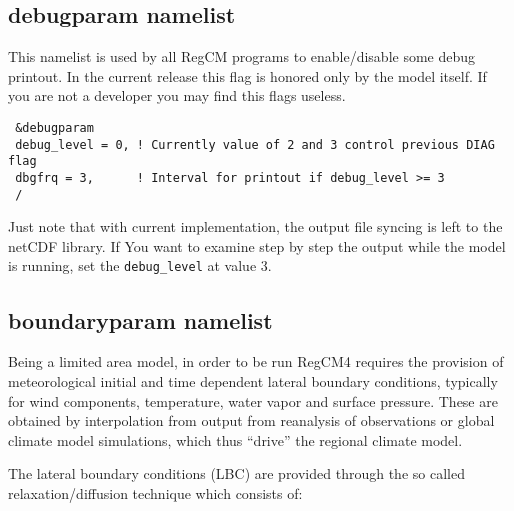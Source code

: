\subsection{debugparam namelist}

This namelist is used by all RegCM programs to enable/disable some debug
printout.  In the current release this flag is honored only by the model
itself. If you are not a developer you may find this flags useless.

{\footnotesize
\begin{Verbatim}
 &debugparam
 debug_level = 0, ! Currently value of 2 and 3 control previous DIAG flag
 dbgfrq = 3,      ! Interval for printout if debug_level >= 3
 /
\end{Verbatim}
}

Just note that with current implementation, the output file syncing is left
to the netCDF library. If You want to examine step by step the output while
the model is running, set the \verb=debug_level= at value 3.

\subsection{boundaryparam namelist}

Being a limited area model, in order to be run RegCM4 requires the provision
of meteorological initial and time dependent lateral boundary conditions,
typically for wind components, temperature, water vapor and surface pressure.
These are obtained by interpolation from output from reanalysis of observations
or global climate model simulations, which thus “drive” the regional climate
model.

The lateral boundary conditions (LBC) are provided through the so called
relaxation/diffusion technique which consists of:


